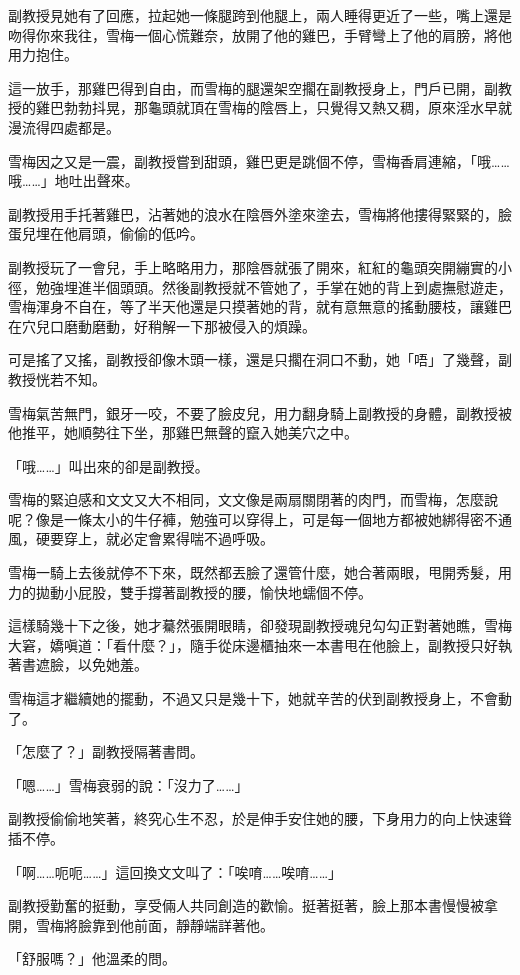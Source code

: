 副教授見她有了回應，拉起她一條腿跨到他腿上，兩人睡得更近了一些，嘴上還是吻得你來我往，雪梅一個心慌難奈，放開了他的雞巴，手臂彎上了他的肩膀，將他用力抱住。

這一放手，那雞巴得到自由，而雪梅的腿還架空擱在副教授身上，門戶已開，副教授的雞巴勃勃抖晃，那龜頭就頂在雪梅的陰唇上，只覺得又熱又稠，原來淫水早就漫流得四處都是。

雪梅因之又是一震，副教授嘗到甜頭，雞巴更是跳個不停，雪梅香肩連縮，「哦……哦……」地吐出聲來。

副教授用手托著雞巴，沾著她的浪水在陰唇外塗來塗去，雪梅將他摟得緊緊的，臉蛋兒埋在他肩頭，偷偷的低吟。

副教授玩了一會兒，手上略略用力，那陰唇就張了開來，紅紅的龜頭突開繃實的小徑，勉強埋進半個頭頭。然後副教授就不管她了，手掌在她的背上到處撫慰遊走，雪梅渾身不自在，等了半天他還是只摸著她的背，就有意無意的搖動腰枝，讓雞巴在穴兒口磨動磨動，好稍解一下那被侵入的煩躁。

可是搖了又搖，副教授卻像木頭一樣，還是只擱在洞口不動，她「唔」了幾聲，副教授恍若不知。

雪梅氣苦無門，銀牙一咬，不要了臉皮兒，用力翻身騎上副教授的身體，副教授被他推平，她順勢往下坐，那雞巴無聲的竄入她美穴之中。

「哦……」叫出來的卻是副教授。

雪梅的緊迫感和文文又大不相同，文文像是兩扇關閉著的肉門，而雪梅，怎麼說呢？像是一條太小的牛仔褲，勉強可以穿得上，可是每一個地方都被她綁得密不通風，硬要穿上，就必定會累得喘不過呼吸。

雪梅一騎上去後就停不下來，既然都丟臉了還管什麼，她合著兩眼，甩開秀髮，用力的拋動小屁股，雙手撐著副教授的腰，愉快地蠕個不停。

這樣騎幾十下之後，她才驀然張開眼睛，卻發現副教授魂兒勾勾正對著她瞧，雪梅大窘，嬌嗔道：「看什麼？」，隨手從床邊櫃抽來一本書甩在他臉上，副教授只好執著書遮臉，以免她羞。

雪梅這才繼續她的擺動，不過又只是幾十下，她就辛苦的伏到副教授身上，不會動了。

「怎麼了？」副教授隔著書問。

「嗯……」雪梅衰弱的說：「沒力了……」

副教授偷偷地笑著，終究心生不忍，於是伸手安住她的腰，下身用力的向上快速聳插不停。

「啊……呃呃……」這回換文文叫了：「唉唷……唉唷……」

副教授勤奮的挺動，享受倆人共同創造的歡愉。挺著挺著，臉上那本書慢慢被拿開，雪梅將臉靠到他前面，靜靜端詳著他。

「舒服嗎？」他溫柔的問。

